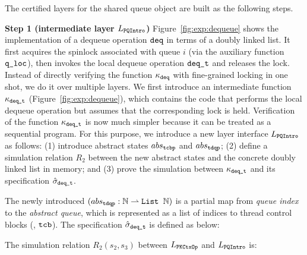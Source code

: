 {

The certified layers for the shared queue object
are built as the following steps.

\noindent\textbf{Step 1 (intermediate layer $L_\pqintro$)} 
Figure~\ref{fig:exp:dequeue} shows
the implementation of a dequeue operation $\deq$ in terms of a doubly linked
list.
It first acquires the spinlock associated with queue $i$
(via the auxiliary function $\qloc$),
then invokes the local dequeue operation $\deq\comm{\_t}$
and releases the lock.
Instead of directly verifying the function $\module_{\deq}$
with fine-grained locking in one shot, we do it over
multiple layers.
We first introduce an intermediate function
$\module_{\deq\comm{\_t}}$ (\cf Figure~\ref{fig:exp:dequeue}), which contains
the code that performs the local dequeue operation but assumes that
the corresponding lock is held.
Verification of the function $\module_{\deq\comm{\_t}}$ is now much
simpler because it can be treated as a sequential program.
For this purpose, we introduce a new layer interface $L_\pqintro$ as follows:
(1) introduce abstract states $abs_\comm{tcbp}$ and $abs_\comm{tdqp}$;
(2) define a simulation relation $R_{2}$ between the new abstract states
and the concrete doubly linked list in memory;
and (3) prove the simulation between
$\module_{\deq\comm{\_t}}$ and its specification
$\spec_{\deq\comm{\_t}}$.

	
The newly introduced $(abs_\comm{tdqp}: \integer \partf 
\comm{List\ }\integer)$ is a partial map from \emph{queue index}
to the \emph{abstract queue}, which is represented as
a list of indices to thread control blocks (\ie, $\comm{tcb}$).
The specification $\spec_{\deq\comm{\_t}}$ is defined as below:
\begin{mathpar}
\end{mathpar}
The  simulation relation 
$R_{2} (s_2, s_3)$ between $L_\pkctxop$ and $L_\pqintro$
is:

}
